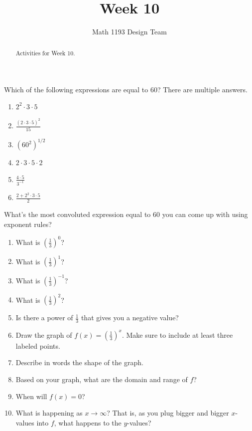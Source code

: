 \documentclass[noauthor,noinstructornotes]{ximera}
\title{Week 10}
\author{Math 1193 Design Team}
\begin{document}
\begin{abstract}
    Activities for Week 10.
\end{abstract}
\maketitle

\begin{problem}
Which of the following expressions are equal to 60? There are multiple
answers.

\begin{enumerate}
    \item \(2^2 \cdot 3 \cdot 5\)
    \item \(\frac{(2\cdot 3\cdot 5)^2}{15}\)
    \item \((60^2)^{1/2}\)
    \item \(2\cdot 3\cdot 5\cdot 2\)
    \item \(\frac{4\cdot 5}{3^{-1}}\)
    \item \(\frac{2 + 2^2 \cdot 3 \cdot 5}{2}\)
\end{enumerate}

What's the most convoluted expression equal to 60 you can come up
with using exponent rules?
\end{problem}

\begin{problem}
\begin{enumerate}
    \item What is \(\left(\frac{1}{3}\right)^0\)?
    \item What is \(\left(\frac{1}{3}\right)^1\)?
    \item What is \(\left(\frac{1}{3}\right)^{-1}\)?
    \item What is \(\left(\frac{1}{3}\right)^2\)?
    \item Is there a power of \(\frac{1}{3}\) that gives you a negative value?
    \item Draw the graph of \(f(x) =\left(\frac{1}{3}\right)^x\). Make sure to 
    include at least three labeled points.
    \item Describe in words the shape of the graph.
    \item Based on your graph, what are the domain and range of \(f\)?
    \item When will \(f(x) = 0\)?
    \item What is happening as \(x \to \infty\)? That is, as you plug
    bigger and bigger \(x\)-values into \(f\), what happens to the \(y\)-values?
\end{enumerate}
\end{problem}
\end{document}
